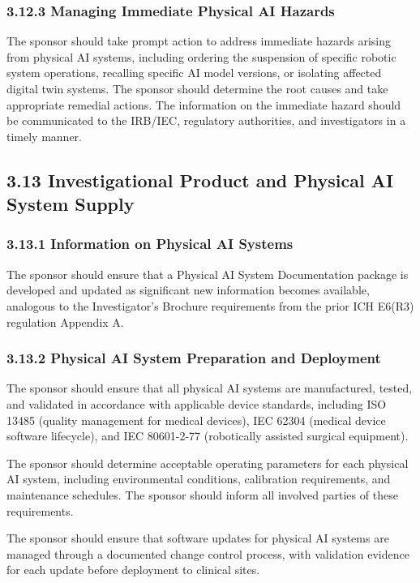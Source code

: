 \subsubsection{3.12.3 Managing Immediate Physical AI Hazards}

The sponsor should take prompt action to address immediate hazards arising from physical AI systems, including ordering the suspension of specific robotic system operations, recalling specific AI model versions, or isolating affected digital twin systems. The sponsor should determine the root causes and take appropriate remedial actions. The information on the immediate hazard should be communicated to the IRB/IEC, regulatory authorities, and investigators in a timely manner.

\subsection{3.13 Investigational Product and Physical AI System Supply}

\subsubsection{3.13.1 Information on Physical AI Systems}

The sponsor should ensure that a Physical AI System Documentation package is developed and updated as significant new information becomes available, analogous to the Investigator's Brochure requirements from the prior ICH E6(R3) regulation Appendix A.

\subsubsection{3.13.2 Physical AI System Preparation and Deployment}

\begin{description}[leftmargin=2.5cm,style=sameline]

\item[(a)] The sponsor should ensure that all physical AI systems are manufactured, tested, and validated in accordance with applicable device standards, including ISO 13485 (quality management for medical devices), IEC 62304 (medical device software lifecycle), and IEC 80601-2-77 (robotically assisted surgical equipment).

\item[(b)] The sponsor should determine acceptable operating parameters for each physical AI system, including environmental conditions, calibration requirements, and maintenance schedules. The sponsor should inform all involved parties of these requirements.

\item[(c)] The sponsor should ensure that software updates for physical AI systems are managed through a documented change control process, with validation evidence for each update before deployment to clinical sites.

\end{description}

